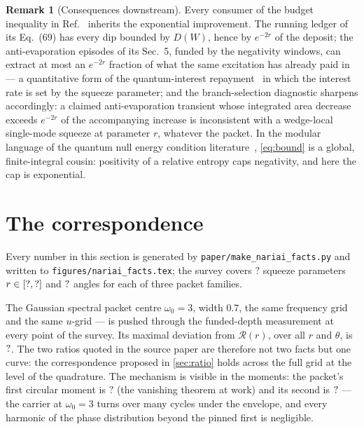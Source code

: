 \documentclass[11pt,a4paper]{article}
\newcommand{\NFMomOneGaussThree}{?}\newcommand{\NFMomTwoContour}{?}
\newcommand{\NFRGridMin}{?}\newcommand{\NFRGridN}{?}
\theoremstyle{plain}
\theoremstyle{definition}
\newtheorem{remark}{Remark}
\begin{document}
\begin{remark}[Consequences downstream]
Every consumer of the budget inequality in Ref.~\cite{NariaiI} inherits the
exponential improvement. The running ledger of its Eq.~(69) has every dip
bounded by $D(W)$, hence by $e^{-2r}$ of the deposit; the anti-evaporation
episodes of its Sec.~5, funded by the negativity windows, can extract at
most an $e^{-2r}$ fraction of what the same excitation has already paid in
--- a quantitative form of the quantum-interest repayment~\cite{FordRoman}
in which the interest rate is set by the squeeze parameter; and the
branch-selection diagnostic sharpens accordingly: a claimed
anti-evaporation transient whose integrated area decrease exceeds
$e^{-2r}$ of the accompanying increase is inconsistent with a wedge-local
single-mode squeeze at parameter $r$, whatever the packet. In the modular
language of the quantum null energy condition
literature~\cite{BFLW,Faulkner2016}, \cref{eq:bound} is a global,
finite-integral cousin: positivity of a relative entropy caps negativity,
and here the cap is exponential.
\end{remark}


\section{The correspondence}
\label{sec:numerics}

Every number in this section is generated by
\texttt{paper/make\_nariai\_facts.py} and written to
\texttt{figures/nariai\_facts.tex}; the survey covers $\NFRGridN$ squeeze
parameters $r \in [\NFRGridMin, \NFRGridMax]$ and $?$ angles for
each of three packet families.

The Gaussian spectral packet centre $\omega_0 = 3$, width $0.7$, 
the same frequency grid and the same $u$-grid --- is pushed
through the funded-depth measurement at every point of the survey. Its
maximal deviation from $\mathcal{R}(r)$, over all $r$ and $\theta$, is
$?$. The two ratios quoted in the source paper are therefore
not two facts but one curve: the correspondence proposed in
\cref{sec:ratio} holds across the full grid at the level of the quadrature.
The mechanism is visible in the moments: the packet's first circular moment
is $\NFMomOneGaussThree$ (the vanishing theorem at work) and its second is
$?$ --- the carrier at $\omega_0 = 3$ turns over many
cycles under the envelope, and every harmonic of the phase distribution
beyond the pinned first is negligible.
\end{document}
